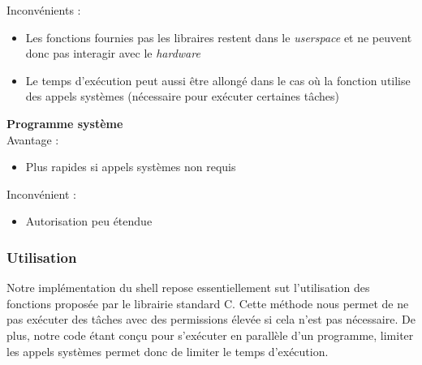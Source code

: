 \documentclass[10pt,a4paper]{article}
\begin{document}
Inconvénients :
\begin{itemize}
\item Les fonctions fournies pas les libraires restent dans le \textit{userspace} et ne peuvent donc pas interagir avec le \textit{hardware}

\item Le temps d'exécution peut aussi être allongé dans le cas où la fonction utilise des appels systèmes (nécessaire pour exécuter certaines tâches)
\end{itemize}


\textbf{Programme système\\}
Avantage :
\begin{itemize}
\item Plus rapides si appels systèmes non requis
\end{itemize}

Inconvénient : 
\begin{itemize}
\item Autorisation peu étendue 
\end{itemize}

\subsubsection{Utilisation}
Notre implémentation du shell repose essentiellement sut l'utilisation des fonctions proposée par le librairie standard C. Cette méthode nous permet de ne pas exécuter des tâches avec des permissions élevée si cela n'est pas nécessaire. De plus, notre code étant conçu pour s'exécuter en parallèle d'un programme, limiter les appels systèmes permet donc de limiter le temps d'exécution. 
\end{document}
